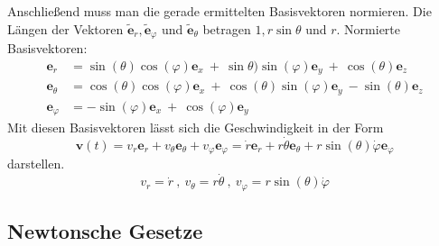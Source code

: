 \documentclass[a4paper,12p]{article}
\begin{document}
Anschließend muss man die gerade ermittelten Basisvektoren normieren.\newline
Die Längen der Vektoren $\tilde{\textbf{e}}_{r},\tilde{\textbf{e}}_{\varphi}$ und $\tilde{\textbf{e}}_{\theta}$ betragen $1,r\sin\theta$ und $r$.
\newline
Normierte Basisvektoren:
\begin{align*}
	\textbf{e}_{r} & = \sin(\theta)\cos(\varphi)\textbf{e}_{x} \ + \ \sin\theta)\sin(\varphi)\textbf{e}_{y} \ + \ \cos(\theta)\textbf{e}_{z} \\
	\textbf{e}_{\theta} & = \cos(\theta)\cos(\varphi)\textbf{e}_{x} \ + \ \cos(\theta)\sin(\varphi)\textbf{e}_{y} \ - \sin(\theta)\textbf{e}_{z} \\
	\textbf{e}_{\varphi} & = -\sin(\varphi)\textbf{e}_{x} \ + \ \cos(\varphi)\textbf{e}_{y}
\end{align*}
Mit diesen Basisvektoren lässt sich die Geschwindigkeit in der Form
\begin{equation*}
	\textbf{v}(t) = v_{r}\textbf{e}_{r} + v_{\theta}\textbf{e}_{\theta} + v_{\varphi}\textbf{e}_{\varphi} = \dot{r}\textbf{e}_{r} + r\dot{\theta}\textbf{e}_{\theta} +  r\sin(\theta)\dot{\varphi}\textbf{e}_{\varphi}
\end{equation*}
darstellen.
\begin{equation*}
	v_r = \dot{r} \ , \ v_\theta = r\dot{\theta} \ , \ v_\varphi = r\sin(\theta)\dot{\varphi}
\end{equation*}
\newpage
\subsection{Newtonsche Gesetze}
\end{document}
